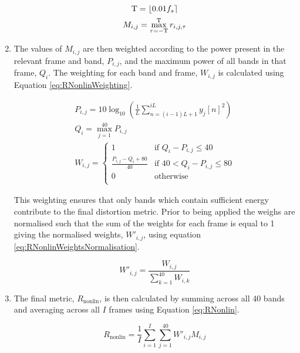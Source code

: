 \begin{enumerate}
					\begin{gather}
						\mathrm{T} = \left\lfloor0.01f_{s}\right\rceil \nonumber \\
						M_{i,j} = \max_{\tau = -\mathrm{T}}^{\mathrm{T}} r_{i,j,\tau}
						\label{eq:RNonlinMaxCrossCorrelation}
					\end{gather}

				\item The values of $M_{i,j}$ are then weighted according to the power present in the
					relevant frame and band, $P_{i,j}$, and the maximum power of all bands in that
					frame, $Q_{i}$. The weighting for each band and frame, $W_{i,j}$ is calculated using
					Equation \ref{eq:RNonlinWeighting}.

					\begin{gather}
						P_{i,j} = 10\log_{10} \left( \frac{1}{L} 
								\sum_{n=(i-1)L+1}^{iL} y_{j}[n]^{2}\right) \nonumber \\
						Q_{i} = \max_{j = 1}^{40} P_{i,j} \nonumber \\
						W_{i,j} = \begin{cases}
							1 & \text{if $Q_{i} - P_{i,j} \leq 40$} \\
							\frac{P_{i,j} - Q_{i} + 80}{40} & 
								\text{if $40 < Q_{i} - P_{i,j} \leq 80$} \\
							0 & \text{otherwise} \\
						\end{cases}
						\label{eq:RNonlinWeighting}
					\end{gather}

					This weighting ensures that only bands which contain sufficient energy contribute to
					the final distortion metric. Prior to being applied the weighs are normalised such
					that the sum of the weights for each frame is equal to 1 giving the normalised
					weights, $W'_{i,j}$, using equation \ref{eq:RNonlinWeightsNormalisation}.

					\begin{equation}
						W'_{i,j} = \frac{W_{i, j}}{\sum_{k = 1}^{40} W_{i,k}}
						\label{eq:RNonlinWeightsNormalisation}
					\end{equation}

				\item The final metric, $R_{\mathrm{nonlin}}$, is then calculated by summing across all 40
					bands and averaging across all $I$ frames using Equation \ref{eq:RNonlin}.

					\begin{equation}
						R_{\mathrm{nonlin}} = \frac{1}{I} \sum_{i = 1}^{I} \sum_{j = 1}^{40} 
									W'_{i,j}M_{i,j}
						\label{eq:RNonlin}
					\end{equation}

			\end{enumerate}

